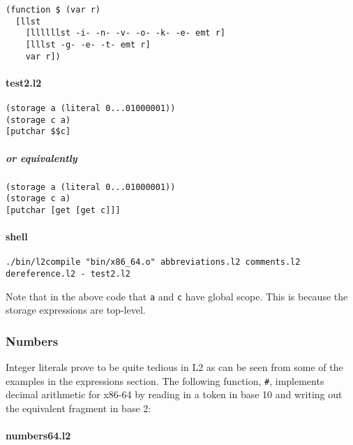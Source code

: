 \documentclass[]{article}
\let\oldparagraph\paragraph
\renewcommand{\paragraph}[1]{\oldparagraph{#1}\mbox{}}
\let\oldsubparagraph\subparagraph
\renewcommand{\subparagraph}[1]{\oldsubparagraph{#1}\mbox{}}
\begin{document}
\begin{verbatim}
(function $ (var r)
  [llst
    [llllllst -i- -n- -v- -o- -k- -e- emt r]
    [lllst -g- -e- -t- emt r]
    var r])
\end{verbatim}

\paragraph{test2.l2}\label{test2.l2}

\begin{verbatim}
(storage a (literal 0...01000001))
(storage c a)
[putchar $$c]
\end{verbatim}

\subparagraph{or equivalently}\label{or-equivalently}

\begin{verbatim}
(storage a (literal 0...01000001))
(storage c a)
[putchar [get [get c]]]
\end{verbatim}

\paragraph{shell}\label{shell-1}

\begin{verbatim}
./bin/l2compile "bin/x86_64.o" abbreviations.l2 comments.l2 dereference.l2 - test2.l2
\end{verbatim}

Note that in the above code that \texttt{a} and \texttt{c} have global
scope. This is because the storage expressions are top-level.

\hypertarget{numbers}{\subsubsection{Numbers}\label{numbers}}

Integer literals prove to be quite tedious in L2 as can be seen from
some of the examples in the expressions section. The following function,
\texttt{\#}, implements decimal arithmetic for x86-64 by reading in a
token in base 10 and writing out the equivalent fragment in base 2:

\paragraph{numbers64.l2}\label{numbers64.l2}
\end{document}
